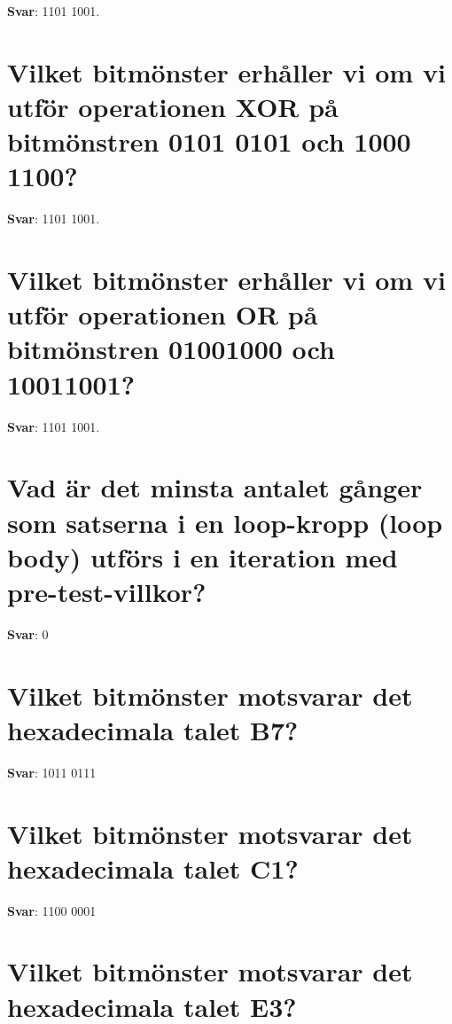 \documentclass[a4paper,11pt,oneside]{book}
\begin{document}
\begin{sloppypar}
\label{q:417:sa:sv:True}

\textbf{Svar}: 1101 1001.



\section{Vilket bitm\"onster erh\r{a}ller vi om vi utf\"or operationen XOR p\r{a} bitm\"onstren 0101 0101 och 1000 1100?}

\label{q:418:sa:sv:True}

\textbf{Svar}: 1101 1001.



\section{Vilket bitm\"onster erh\r{a}ller vi om vi utf\"or operationen OR p\r{a} bitm\"onstren 01001000 och 10011001?}

\label{q:419:sa:sv:True}

\textbf{Svar}: 1101 1001.



\section{Vad \"ar det minsta antalet g\r{a}nger som satserna i en loop-kropp (loop body) utf\"ors i en iteration med pre-test-villkor?}

\label{q:420:sa:sv:True}

\textbf{Svar}: 0



\section{Vilket bitm\"onster motsvarar det hexadecimala talet B7?}

\label{q:421:sa:sv:True}

\textbf{Svar}: 1011 0111



\section{Vilket bitm\"onster motsvarar det hexadecimala talet C1?}

\label{q:422:sa:sv:True}

\textbf{Svar}: 1100 0001



\section{Vilket bitm\"onster motsvarar det hexadecimala talet E3?}


\end{sloppypar}
\end{document}
